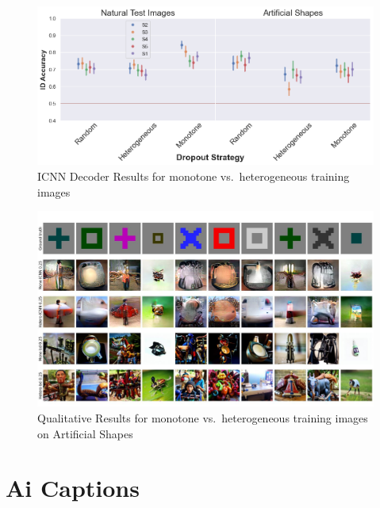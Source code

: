  \begin{figure}[ht]
   \centering
   \includegraphics[width=1\textwidth]{plots/dropout_discussion_translator_id_acc_icnn.png}
   \caption{ICNN Decoder Results for monotone vs.\ heterogeneous training images}\label{fig:dropout_discussion_translator_id_acc_icnn}
 \end{figure}
 
 \begin{figure}[ht]
   \centering
   \includegraphics[width=1\textwidth]{plots/dropout_discussion_art.JPEG}
   \caption{Qualitative Results for monotone vs.\ heterogeneous training images on Artificial Shapes}\label{fig:dropout_discussion_art}
 \end{figure}


\section{Ai Captions}

